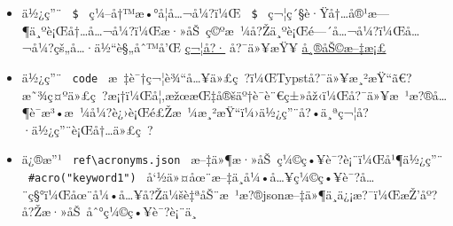 \begin{itemize}
\begin{Shaded}
\begin{Highlighting}[]
\NormalTok{    [1], [2], [3], [4],}
\NormalTok{    [a], [b], [c], [d],}
\NormalTok{    [e], [f], [g], [h],}
\NormalTok{    [i], [j], [k], [l]}
\end{Highlighting}
\end{Shaded}
\item
  ä½¿ç''¨ \texttt{\ \$\ } ç¼--å†™æ•°å­¦å\ldots¬å¼?ï¼Œ \texttt{\ \$\ }
  ç¬¦ç´§è·Ÿå†\ldots å®¹æ---¶ä¸ºè¡Œå†\ldots å\ldots¬å¼?ï¼Œæ·»åŠ~ç©ºæ~¼å?Žä¸ºè¡Œé---´å\ldots¬å¼?ï¼Œå\ldots¬å¼?çš„å\ldots·ä½``è§„åˆ™å'Œ
  \href{https://typst.app/docs/reference/symbols/sym/}{ç¬¦å?·} å?¯ä»¥æŸ¥
  \href{https://typst.app/docs/reference/math/}{å¸®åŠ©æ--‡æ¡£}

\begin{Shaded}
\begin{Highlighting}[]

\end{Highlighting}
\end{Shaded}
\item
  ä½¿ç''¨
  \texttt{\ \textasciigrave{}\textasciigrave{}\textasciigrave{}code\textasciigrave{}\textasciigrave{}\textasciigrave{}\ }
  æ~‡è¯†ç¬¦è¾``å\ldots¥ä»£ç~?ï¼ŒTypstå?¯ä»¥æ¸²æŸ``ã€?æ˜¾ç¤ºä»£ç~?æ¡†ï¼Œå¦‚æžœæŒ‡å®šäº†è¯­è¨€ç±»åž‹ï¼Œå?¯ä»¥æ~¹æ?®å\ldots¶è¯­æ³•æ~¼å¼?è¿›è¡Œé£Žæ~¼æ¸²æŸ``ï¼›ä½¿ç''¨å?•ä¸ªç¬¦å?·ä½¿ç''¨è¡Œå†\ldots ä»£ç~?

\begin{Shaded}
\begin{Highlighting}[]
\NormalTok{  \textasciigrave{}\textasciigrave{}\textasciigrave{}}
\end{Highlighting}
\end{Shaded}
\item
  ä¿®æ''¹ \texttt{\ ref\textbackslash{}acronyms.json\ }
  æ--‡ä»¶æ·»åŠ~ç¼©ç•¥è¯?è¡¨ï¼Œå¹¶ä½¿ç''¨ \texttt{\ \#acro("keyword1")\ }
  å`½ä»¤åœ¨æ--‡ä¸­å¼•å\ldots¥ç¼©ç•¥è¯?å\ldots¨ç§°ï¼Œåœ¨å¼•å\ldots¥å?Žä¼šè‡ªåŠ¨æ~¹æ?®jsonæ--‡ä»¶ä¸­ä¿¡æ?¯ï¼ŒæŽ'åº?å?Žæ·»åŠ~åˆ°ç¼©ç•¥è¯?è¡¨ä¸­


\end{itemize}

